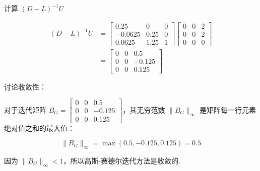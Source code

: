 \begin{tcolorbox}[enhanced,colback=10,colframe=9,breakable,coltitle=green!25!black,title=2024]
 计算 $(D-L)^{-1} U$

$$
\begin{aligned}
(D-L)^{-1} U &= \begin{bmatrix}
0.25 & 0 & 0 \\
-0.0625 & 0.25 & 0 \\
0.0625 & 1.25 & 1
\end{bmatrix} \begin{bmatrix}
0 & 0 & 2 \\
0 & 0 & 2 \\
0 & 0 & 0
\end{bmatrix} \\
&= \begin{bmatrix}
0 & 0 & 0.5 \\
0 & 0 & -0.125 \\
0 & 0 & 0.125
\end{bmatrix}
\end{aligned}
$$



 讨论收敛性：

对于迭代矩阵 $B_{G} = \begin{bmatrix} 0 & 0 & 0.5 \\ 0 & 0 & -0.125 \\ 0 & 0 & 0.125 \end{bmatrix}$，其无穷范数 $\|B_{G}\|_{\infty}$ 是矩阵每一行元素绝对值之和的最大值：

$$
\|B_{G}\|_{\infty} = \max(0.5, -0.125, 0.125) = 0.5
$$

因为 $\|B_{G}\|_{\infty} < 1$，所以高斯-赛德尔迭代方法是收敛的.
\end{tcolorbox}


